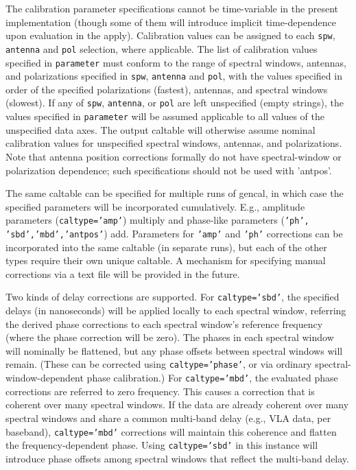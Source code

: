 The calibration parameter specifications cannot be time-variable in the present
implementation (though some of them will introduce implicit
time-dependence upon evaluation in the apply).  Calibration values can be assigned to each {\tt spw},
{\tt antenna} and {\tt pol} selection, where applicable.  The list 
of calibration values specified in {\tt parameter} must conform to
the range of spectral windows, antennas, and polarizations specified
in {\tt spw}, {\tt antenna} and {\tt pol}, with the values specified
in order of the specified polarizations (fastest), antennas, and spectral
windows (slowest).  If any of {\tt spw}, 
{\tt antenna}, or {\tt pol} are left unspecified (empty strings), the
values specified in {\tt parameter} will be assumed applicable to
all values of the unspecified data axes. The output caltable will
otherwise assume nominal calibration values for unspecified spectral
windows, antennas, and polarizations.  Note that antenna position
corrections formally do not have spectral-window or polarization
dependence; such specifications should not be used with 'antpos'.

The same caltable can be specified for multiple runs of gencal, in
which case the specified parameters will be incorporated cumulatively.
E.g., amplitude parameters ({\tt caltype='amp'}) multiply and
phase-like parameters ({\tt 'ph', 'sbd','mbd','antpos'}) add.
Parameters for {\tt 'amp'} and {\tt 'ph'} corrections can be
incorporated into the same caltable (in separate runs), but each of
the other types require their own unique caltable.  A mechanism for
specifying manual corrections via a text file will be provided in the
future.

Two kinds of delay corrections are supported.  For {\tt caltype='sbd'},
the specified delays (in nanoseconds) will be applied locally to 
each spectral window, referring the derived phase corrections to
each spectral window's reference frequency (where the phase correction
will be zero).  The phases in each spectral window will nominally be
flattened, but any phase offsets between spectral windows will remain.
(These can be corrected using {\tt caltype='phase'}, or via ordinary
spectral-window-dependent phase calibration.)  For {\tt caltype='mbd'},
the evaluated phase corrections are referred to zero frequency.  This
causes a correction that is coherent over many spectral windows. 
If the data are already coherent over many spectral windows and share
a common multi-band delay (e.g., VLA data, per baseband), {\tt caltype='mbd'} 
corrections will maintain this coherence and flatten the 
frequency-dependent phase.  Using {\tt caltype='sbd'} in this instance
will introduce phase offsets among spectral windows that reflect
the multi-band delay.  

